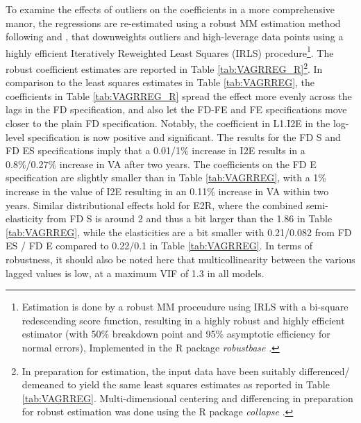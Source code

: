 \documentclass[a4paper]{article}
\begin{document}
To examine the effects of outliers on the coefficients in a more comprehensive manor, the regressions are re-estimated using a robust MM estimation method following \citet{yohai1987high} and \citet{koller2011sharpening}, that downweights outliers and high-leverage data points using a highly efficient Iteratively Reweighted Least Squares (IRLS) procedure\footnote{Estimation is done by a robust MM proceudure using IRLS with a bi-square redescending score function, resulting in a highly robust and highly efficient estimator (with 50\% breakdown point and 95\% asymptotic efficiency for normal errors), Implemented in the R package \textit{robustbase} \citep{rousseeuw2009robustbase}.}. The robust coefficient estimates are reported in Table \ref{tab:VAGRREG_R}\footnote{In preparation for estimation, the input data have been suitably differenced/ demeaned to yield the same least squares estimates as reported in Table \ref{tab:VAGRREG}. Multi-dimensional centering and differencing in preparation for robust estimation was done using the R package \textit{collapse} \citep{collapse2021}.}. In comparison to the least squares estimates in Table \ref{tab:VAGRREG}, the coefficients in Table \ref{tab:VAGRREG_R} spread the effect more evenly across the lags in the FD specification, and also let the FD-FE and FE specifications move closer to the plain FD specification. Notably, the coefficient in L1.I2E in the log-level specification is now positive and significant. The results for the FD S and FD ES specifications imply that a 0.01/1\% increase in I2E results in a 0.8\%/0.27\% increase in VA after two years. The coefficients on the FD E specification are slightly smaller than in Table  \ref{tab:VAGRREG}, with a 1\% increase in the value of I2E resulting in an 0.11\% increase in VA within two years. Similar distributional effects hold for E2R, where the combined semi-elasticity from FD S is around 2 and thus a bit larger than the 1.86 in Table \ref{tab:VAGRREG}, while the elasticities are a bit smaller with 0.21/0.082 from FD ES / FD E compared to 0.22/0.1 in Table \ref{tab:VAGRREG}. In terms of robustness, it should also be noted here that multicollinearity between the various lagged values is low, at a maximum VIF of 1.3 in all models. 
\end{document}
